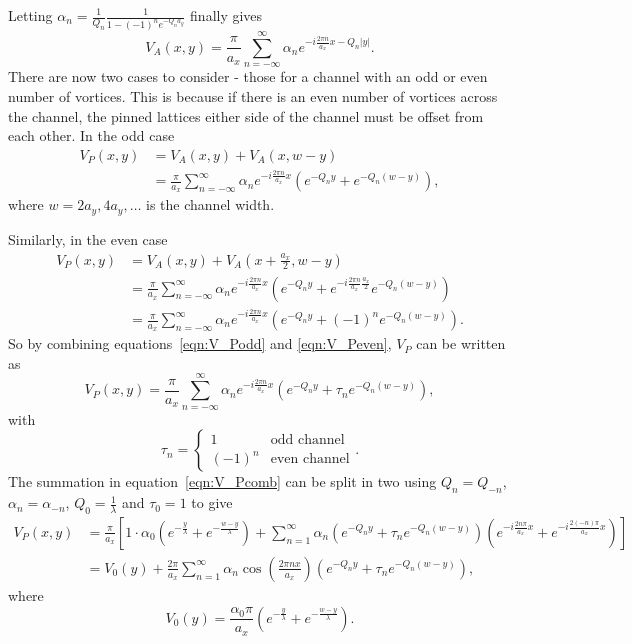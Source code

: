 \documentclass{article}
\numberwithin{equation}{section}
\begin{document}
Letting $\alpha_n = \frac{1}{Q_n}\frac{1}{1-(-1)^ne^{-Q_na_y}}$ finally gives
\begin{equation}
    V_A(x, y) = \frac{\pi}{a_x}\sum_{n=-\infty}^\infty\alpha_n e^{-i\frac{2\pi n}{a_x}x-Q_n|y|}.
\end{equation}
There are now two cases to consider - those for a channel with an odd or even number of vortices. This is because if there is an even number of vortices across the channel, the pinned lattices either side of the channel must be offset from each other.
In the odd case
\begin{align}
    V_P(x, y) &= V_A(x, y) + V_A(x, w-y) \nonumber \\
    &= \frac{\pi}{a_x}\sum_{n=-\infty}^\infty\alpha_n e^{-i\frac{2\pi n}{a_x}x} \left(e^{-Q_ny}+e^{-Q_n(w-y)}\right), \label{eqn:V_Podd}
\end{align}
where $w = 2a_y, 4a_y, \ldots$ is the channel width.

Similarly, in the even case
\begin{align}
    V_P(x, y) &= V_A(x, y) + V_A(x+\frac{a_x}{2}, w-y) \nonumber \\
    &= \frac{\pi}{a_x}\sum_{n=-\infty}^\infty\alpha_n e^{-i\frac{2\pi n}{a_x}x} \left(e^{-Q_ny}+e^{-i\frac{2\pi n}{a_x}\frac{a_x}{2}}e^{-Q_n(w-y)}\right) \nonumber \\
    &= \frac{\pi}{a_x}\sum_{n=-\infty}^\infty\alpha_n e^{-i\frac{2\pi n}{a_x}x} \left(e^{-Q_ny}+(-1)^ne^{-Q_n(w-y)}\right). \label{eqn:V_Peven}
\end{align}
So by combining equations~\ref{eqn:V_Podd} and \ref{eqn:V_Peven}, $V_P$ can be written as
\begin{equation}
    V_P(x, y) = \frac{\pi}{a_x}\sum_{n=-\infty}^\infty\alpha_n e^{-i\frac{2\pi n}{a_x}x} \left(e^{-Q_ny}+\tau_ne^{-Q_n(w-y)}\right), \label{eqn:V_Pcomb}
\end{equation}
with
\begin{equation}
    \tau_n = \left\{
    \begin{array}{ll}
        1 & \textrm{odd channel} \\
        (-1)^n & \textrm{even channel}
    \end{array}
    \right ..
\end{equation}
The summation in equation~\ref{eqn:V_Pcomb} can be split in two using $Q_n = Q_{-n}$, $\alpha_n = \alpha_{-n}$, $Q_0 = \frac{1}{\lambda}$ and $\tau_0 = 1$ to give
\begin{align}
    V_P(x, y) &= \frac{\pi}{a_x} \left[1\cdot\alpha_0\left(e^{-\frac{y}{\lambda}}+e^{-\frac{w-y}{\lambda}}\right) +\sum_{n=1}^\infty\alpha_n\left(e^{-Q_ny}+\tau_ne^{-Q_n(w-y)}\right) \left(e^{-i\frac{2n\pi}{a_x}x}+e^{-i\frac{2(-n)\pi}{a_x}x}\right) \right] \nonumber \\
    &= V_0(y) + \frac{2\pi}{a_x}\sum_{n=1}^\infty\alpha_n\cos\left(\frac{2\pi nx}{a_x}\right) \left(e^{-Q_ny}+\tau_ne^{-Q_n(w-y)}\right), \label{eqn:V_p_final}
\end{align}
where
\begin{equation}
    V_0(y) = \frac{\alpha_0\pi}{a_x}\left(e^{-\frac{y}{\lambda}}+e^{-\frac{w-y}{\lambda}}\right).
\end{equation}
\end{document}
